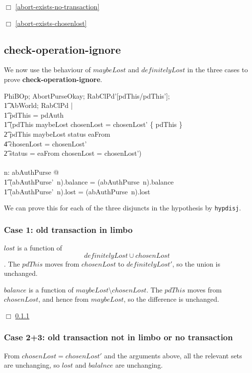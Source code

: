 $\Box$ \ref{abort-exists-no-transaction}

$\Box$ \ref{abort-exists-chosenlost}
\subsection{check-operation-ignore}
\label{abort-check-operation}
We now use the behaviour of $maybeLost$ and $definitelyLost$ in the
three cases to prove {\bf check-operation-ignore}.
\begin{gzed}
  PhiBOp; AbortPurseOkay; RabClPd'[pdThis/pdThis'];
  \\ %
  \t1 AbWorld; RabClPd
  |
  \\ %
  \t1 pdThis = pdAuth
  \\ %
  \t1 \land (pdThis \in maybeLost \land chosenLost = chosenLost' \cup
  \{ pdThis \}
  \\ %
  \t2 \lor pdThis \notin maybeLost \land status \neq eaFrom
  \\ %
  \t4 \land chosenLost = chosenLost'
  \\ %
  \t2 \lor status = eaFrom \land chosenLost = chosenLost')
  \\ %
  \shows
  \\ %
  \forall n: \dom abAuthPurse @
  \\ %
  \t1 (abAuthPurse'~n).balance = (abAuthPurse~n).balance
  \\ %
  \t1 \land (abAuthPurse'~n).lost = (abAuthPurse~n).lost
\end{gzed}
We can prove this for each of the three disjuncts in the hypothesis
by \texttt{hypdisj}.
\subsubsection{Case 1: old transaction in limbo}
\label{abort-check-inlimbo}
$lost$ is a function of
\[definitelyLost \cup chosenLost\].  The
$pdThis$ moves from $chosenLost$ to $definitelyLost'$, so the
union is unchanged.

$balance$ is a function of $maybeLost \setminus chosenLost$.  The
$pdThis$ moves from $chosenLost$, and hence from $maybeLost$, so the
difference is unchanged.

$\Box$ \ref{abort-check-inlimbo}
\subsubsection{Case 2+3: old transaction not in limbo or no transaction}
\label{abort-check-not-inlimbo}
From $chosenLost = chosenLost'$ and the arguments above, all the
relevant sets are unchanging, so $lost$ and $balalnce$ are
unchanging.

